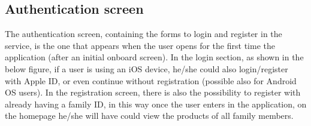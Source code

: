 \subsection{Authentication screen}
The authentication screen, containing the forms to login and register in the service, is the one that appears when the user opens for the first time the application (after an initial onboard screen).
In the login section, as shown in the below figure, if a user is using an iOS device, he/she could also login/register with Apple ID, or even continue without registration (possible also for Android OS users).
In the registration screen, there is also the possibility to register with already having a family ID, in this way once the user enters in the application, on the homepage he/she will have could view the products of all family members.\newline

